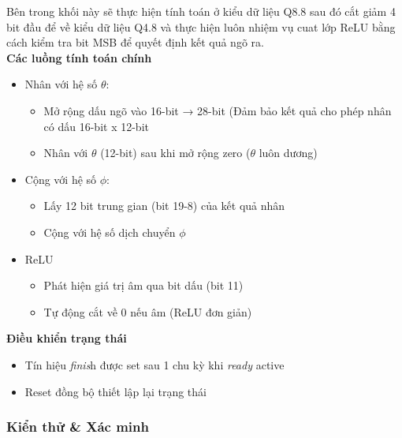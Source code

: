 Bên trong khối này sẽ thực hiện tính toán ở kiểu dữ liệu Q8.8 sau đó cắt giảm 4 bit đầu để về kiểu dữ liệu Q4.8 và thực hiện luôn nhiệm vụ cuat lớp ReLU bằng cách kiểm tra bit MSB để quyết định kết quả ngõ ra. \\
\textbf{Các luồng tính toán chính}
\begin{itemize}
    \item Nhân với hệ số $\theta$:
    \begin{itemize}
        \item Mở rộng dấu ngõ vào 16-bit → 28-bit (Đảm bảo kết quả cho phép nhân có dấu 16-bit x 12-bit
        \item Nhân với $\theta$ (12-bit) sau khi mở rộng zero ($\theta$ luôn dương)
    \end{itemize}
    \item Cộng với hệ số $\phi$:
    \begin{itemize}
        \item Lấy 12 bit trung gian (bit 19-8) của kết quả nhân
        \item Cộng với hệ số dịch chuyển $\phi$
    \end{itemize}
    \item ReLU
    \begin{itemize}
        \item Phát hiện giá trị âm qua bit dấu (bit 11)
        \item Tự động cắt về 0 nếu âm (ReLU đơn giản)
    \end{itemize}
\end{itemize}
\textbf{Điều khiển trạng thái}
\begin{itemize}
    \item Tín hiệu \textit{finis}h được set sau 1 chu kỳ khi \textit{ready} active
    \item Reset đồng bộ thiết lập lại trạng thái
\end{itemize}

\subsubsection{Kiển thử \& Xác minh}

